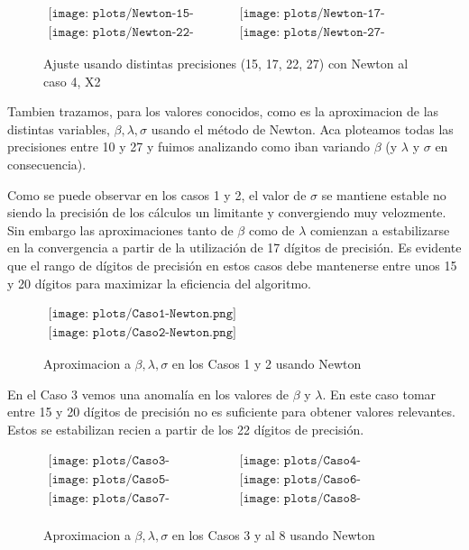 \begin{figure} [H]
$\begin{array}{cc}
\texttt{[image: plots/Newton-15-caso4.png]} &
\texttt{[image: plots/Newton-17-caso4.png]} \\
\texttt{[image: plots/Newton-22-caso4.png]} &
\texttt{[image: plots/Newton-27-caso4.png]}
\end{array}$
\caption{Ajuste usando distintas precisiones (15, 17, 22, 27) con Newton al caso 4, X2}
\label{fig:FitCaso4Newton}
\end{figure}


Tambien trazamos, para los valores conocidos, como es la aproximacion de las distintas variables, $\beta, \lambda, \sigma$ usando el m\'etodo de Newton.
Aca ploteamos todas las precisiones entre 10 y 27 y fuimos analizando como iban variando $\beta$ (y $\lambda$ y $\sigma$ en consecuencia).

Como se puede observar en los casos 1 y 2, el valor de $\sigma$ se mantiene estable no siendo la precisi\'on de los c\'alculos un limitante y convergiendo muy velozmente. Sin embargo las aproximaciones tanto de $\beta$ como de $\lambda$ comienzan a estabilizarse en la convergencia a partir de la utilizaci\'on de 17 d\'igitos de precisi\'on. Es evidente que el rango de d\'igitos de precisi\'on en estos casos debe mantenerse entre unos 15 y 20 d\'igitos para maximizar la eficiencia del algoritmo.  

\begin{figure}
$\begin{array}{c}
\texttt{[image: plots/Caso1-Newton.png]} \\
\texttt{[image: plots/Caso2-Newton.png]}
\end{array}$

\caption{Aproximacion a $\beta, \lambda, \sigma$ en los Casos 1 y 2 usando Newton}
\end{figure}

En el Caso 3 vemos una anomal\'ia en los valores de $\beta$ y $\lambda$. En este caso tomar entre 15 y 20 d\'igitos de precisi\'on no es suficiente para obtener valores relevantes. Estos se estabilizan recien a partir de los 22 d\'igitos de precisi\'on.




\begin{figure}
$\begin{array}{cc}
\texttt{[image: plots/Caso3-Newton.png]} &
\texttt{[image: plots/Caso4-Newton.png]} \\
\texttt{[image: plots/Caso5-Newton.png]} &
\texttt{[image: plots/Caso6-Newton.png]} \\
\texttt{[image: plots/Caso7-Newton.png]} &
\texttt{[image: plots/Caso8-Newton.png]} \\

\end{array}$

\caption{Aproximacion a $\beta, \lambda, \sigma$ en los Casos 3 y al 8 usando Newton}
\label{fig:AproxCasosNewton}
\end{figure}

